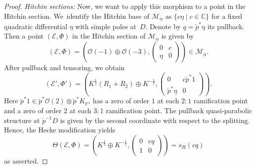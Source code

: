 \documentclass[10pt,a4paper]{amsart}
\numberwithin{equation}{section}
\theoremstyle{definition}
\newcommand{\ualpha}{\underline{\alpha}}
\newcommand{\calE}{\mathcal{E}}
\newcommand{\calM}{\mathcal{M}}
\newcommand{\calO}{\mathcal{O}}
\newcommand{\CC}{\mathbb{C}}
\newcommand{\PP}{\mathbb{P}}
\begin{document}
\begin{proof}
 \textit{Hitchin sections:} Now, we want to apply this morphism to a point in the Hitchin section. We~identify the Hitchin base of $\calM_{\ualpha}$ as $\{ c \eta \mid c \in \CC\}$ for a fixed quadratic differential $\eta$ with simple poles at~$D$. Denote by $q=\check{p}^*\eta$ its pullback. Then a point $(\calE,\Phi)$ in the Hitchin section of $\calM_{\ualpha}$ is given by
 \[ (\calE,\Phi)=\left( \calO(-1) \oplus \calO(-3), \begin{pmatrix} 0 & c \\ \eta & 0 \end{pmatrix} \right) \in \calM_{\ualpha}.
 \]
 After pullback and tensoring, we obtain
 \[ (\calE',\Phi')=\left( K^{\frac12}(R_1+R_2) \oplus K^{-\frac12}, \begin{pmatrix} 0 & c \check{p}^*1 \\ \check{p}^* \eta & 0 \end{pmatrix} \right).
 \]
 Here $\check{p}^*1 \in \check{p}^*\calO(2) \otimes \check{p}^*K_{\PP^1}$ has a zero of order $1$ at each $2:1$ ramification point and a zero of order $2$ at each $3:1$ ramification point. The pullback quasi-parabolic structure at $\check{p}^{-1}D$ is given by the second coordinate with respect to the splitting. Hence, the Hecke modification yields
 \[ \Theta(\calE,\Phi)=\left( K^{\frac12} \oplus K^{-\frac12}, \begin{pmatrix} 0 & cq \\ 1 & 0 \end{pmatrix} \right)=s_H(cq)
 \]
 as asserted.


\end{proof}
\end{document}
